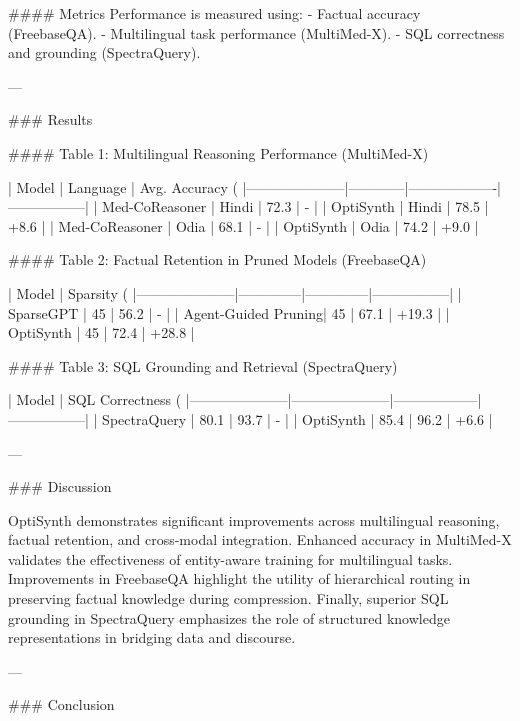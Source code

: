 #### Metrics
Performance is measured using:
- Factual accuracy (FreebaseQA).
- Multilingual task performance (MultiMed-X).
- SQL correctness and grounding (SpectraQuery).

---

### Results

#### Table 1: Multilingual Reasoning Performance (MultiMed-X)

| Model               | Language   | Avg. Accuracy (%
|---------------------|------------|-------------------|-----------------|
| Med-CoReasoner      | Hindi      | 72.3              | -               |
| OptiSynth           | Hindi      | 78.5              | +8.6            |
| Med-CoReasoner      | Odia       | 68.1              | -               |
| OptiSynth           | Odia       | 74.2              | +9.0            |

#### Table 2: Factual Retention in Pruned Models (FreebaseQA)

| Model               | Sparsity (%
|---------------------|--------------|--------------|-----------------|
| SparseGPT           | 45           | 56.2         | -               |
| Agent-Guided Pruning| 45           | 67.1         | +19.3           |
| OptiSynth           | 45           | 72.4         | +28.8           |

#### Table 3: SQL Grounding and Retrieval (SpectraQuery)

| Model               | SQL Correctness (%
|---------------------|---------------------|------------------|-----------------|
| SpectraQuery        | 80.1               | 93.7             | -               |
| OptiSynth           | 85.4               | 96.2             | +6.6            |

---

### Discussion

OptiSynth demonstrates significant improvements across multilingual reasoning, factual retention, and cross-modal integration. Enhanced accuracy in MultiMed-X validates the effectiveness of entity-aware training for multilingual tasks. Improvements in FreebaseQA highlight the utility of hierarchical routing in preserving factual knowledge during compression. Finally, superior SQL grounding in SpectraQuery emphasizes the role of structured knowledge representations in bridging data and discourse.

---

### Conclusion

